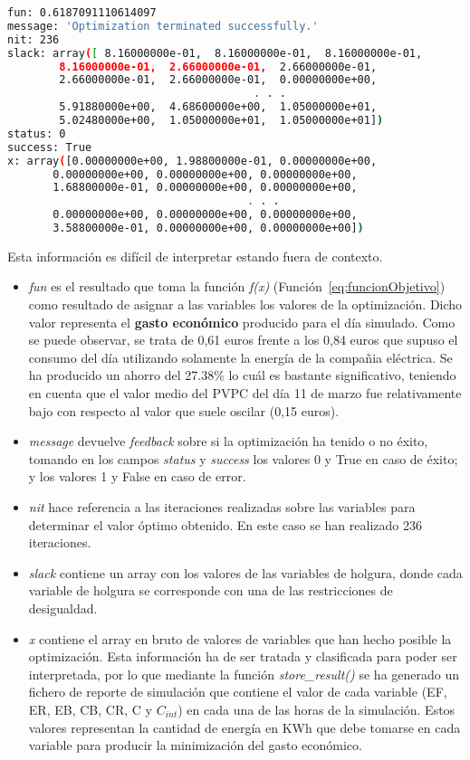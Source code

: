 \begin{lstlisting}[language=bash,float=ht,numbers=none,caption={Salida del algoritmo \textit{linprog}},label={lst:output}]
fun: 0.6187091110614097
message: 'Optimization terminated successfully.'
nit: 236
slack: array([ 8.16000000e-01,  8.16000000e-01,  8.16000000e-01,
        8.16000000e-01,  2.66000000e-01,  2.66000000e-01,
        2.66000000e-01,  2.66000000e-01,  0.00000000e+00,
                                      . . .
        5.91880000e+00,  4.68600000e+00,  1.05000000e+01,
        5.02480000e+00,  1.05000000e+01,  1.05000000e+01])
status: 0
success: True
x: array([0.00000000e+00, 1.98800000e-01, 0.00000000e+00,
       0.00000000e+00, 0.00000000e+00, 0.00000000e+00,
       1.68800000e-01, 0.00000000e+00, 0.00000000e+00,
                                     . . .
       0.00000000e+00, 0.00000000e+00, 0.00000000e+00,
       3.58800000e-01, 0.00000000e+00, 0.00000000e+00])
\end{lstlisting}
Esta información es difícil de interpretar estando fuera de contexto.
\begin{itemize}
\item \textit{fun} es el resultado que toma la función \textit{f(x)} (Función~\ref{eq:funcionObjetivo}) como resultado de asignar a las variables los valores de la optimización. Dicho valor representa el \textbf{gasto económico} producido para el día simulado. Como se puede observar, se trata de 0,61 euros frente a los 0,84 euros que supuso el consumo del día utilizando solamente la energía de la compañia eléctrica. Se ha producido un ahorro del 27.38\% lo cuál es bastante significativo, teniendo en cuenta que el valor medio del \gls{PVPC} del día 11 de marzo fue relativamente bajo con respecto al valor que suele oscilar (0,15 euros).
\item \textit{message} devuelve \textit{feedback} sobre si la optimización ha tenido o no éxito, tomando en los campos \textit{status} y \textit{success} los valores 0 y True en caso de éxito; y los valores 1 y False en caso de error.
\item \textit{nit} hace referencia a las iteraciones realizadas sobre las variables para determinar el valor óptimo obtenido. En este caso se han realizado 236 iteraciones.
\item \textit{slack} contiene un array con los valores de las variables de holgura, donde cada variable de holgura se corresponde con una de las restricciones de desigualdad.
\item \textit{x} contiene el array en bruto de valores de variables que han hecho posible la optimización. Esta información ha de ser tratada y clasificada para poder ser interpretada, por lo que mediante la función \textit{store\_result()} se ha generado un fichero de reporte de simulación que contiene el valor de cada variable (\gls{EF}, \gls{ER}, \gls{EB}, \gls{CB}, \gls{CR}, C y $ C_{int} $) en cada una de las horas de la simulación. Estos valores representan la cantidad de energía en KWh que debe tomarse en cada variable para producir la minimización del gasto económico.
\end{itemize}
